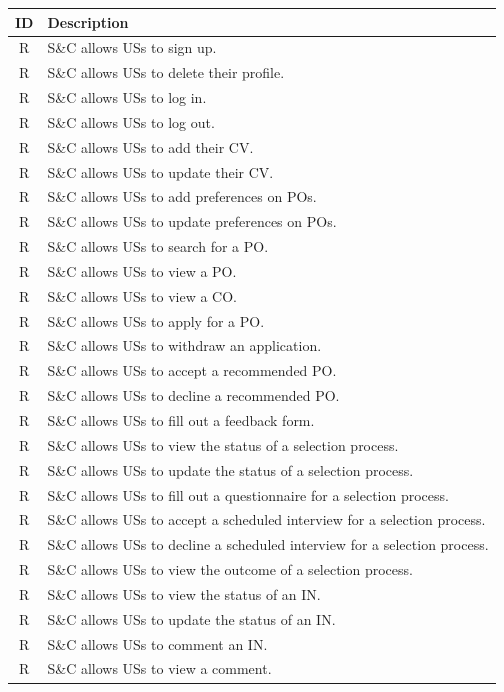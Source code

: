 \setcounter{r}{1}
\newcommand{\rc}{\ther\stepcounter{r}}
\renewcommand{\arraystretch}{1.5}
\begin{longtable}{|c|p{10.5cm}|}
    \hline \rowcolor{polimiblue!40}
    \textbf{ID} & \textbf{Description} \\ \hline
    R\rc & S\&C allows USs to sign up. \\ \hline
    R\rc & S\&C allows USs to delete their profile.\\ \hline
    R\rc & S\&C allows USs to log in. \\ \hline
    R\rc & S\&C allows USs to log out. \\ \hline
    R\rc & S\&C allows USs to add their CV. \\ \hline
    R\rc & S\&C allows USs to update their CV. \\ \hline
    R\rc & S\&C allows USs to add preferences on POs. \\ \hline
    R\rc & S\&C allows USs to update preferences on POs. \\ \hline
    R\rc & S\&C allows USs to search for a PO. \\ \hline
    R\rc & S\&C allows USs to view a PO. \\ \hline
    R\rc & S\&C allows USs to view a CO. \\ \hline
    R\rc & S\&C allows USs to apply for a PO. \\ \hline
    R\rc & S\&C allows USs to withdraw an application. \\ \hline
    R\rc & S\&C allows USs to accept a recommended PO. \\ \hline
    R\rc & S\&C allows USs to decline a recommended PO. \\ \hline
    R\rc & S\&C allows USs to fill out a feedback form. \\ \hline
    R\rc & S\&C allows USs to view the status of a selection process. \\ \hline
    R\rc & S\&C allows USs to update the status of a selection process. \\ \hline
    R\rc & S\&C allows USs to fill out a questionnaire for a selection process. \\ \hline
    R\rc & S\&C allows USs to accept a scheduled interview for a selection process. \\ \hline
    R\rc & S\&C allows USs to decline a scheduled interview for a selection process. \\ \hline
    R\rc & S\&C allows USs to view the outcome of a selection process. \\ \hline
    R\rc & S\&C allows USs to view the status of an IN. \\ \hline
    R\rc & S\&C allows USs to update the status of an IN. \\ \hline
    R\rc & S\&C allows USs to comment an IN. \\ \hline
    R\rc & S\&C allows USs to view a comment. \\ \hline


\end{longtable}
